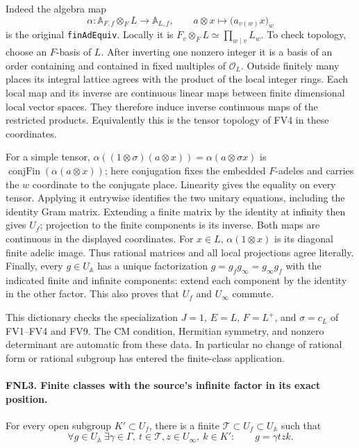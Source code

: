 \documentclass[11pt,a4paper]{article}
\numberwithin{equation}{section}
\theoremstyle{remark}\newtheorem{remark}[theorem]{Remark}
\begin{document}
Indeed the algebra map
\[
 \alpha:\mathbb A_{F,\allowbreak{} f}\otimes_F L\longrightarrow\mathbb A_{L,\allowbreak{} f},
 \qquad a\otimes x\longmapsto \bigl(a_{v(w)}x\bigr)_w
\]
is the original \texttt{fin\allowbreak Ad\allowbreak Equiv}.  Locally it is
\(F_v\otimes_F L\simeq\prod_{w\mid v}L_w\).
To check topology, choose an \(F\)-basis of \(L\).  After inverting
one nonzero integer it is a basis of an order containing and contained
in fixed multiples of \(\mathcal O_L\).  Outside finitely many places
its integral lattice agrees with the product of the local integer
rings.  Each local map and its inverse are continuous linear maps
between finite dimensional local vector spaces.  They therefore induce
inverse continuous maps of the restricted products.  Equivalently this
is the tensor topology of FV4 in these coordinates.

For a simple tensor,
\(\alpha((1\otimes\sigma)(a\otimes x))=\alpha(a\otimes\sigma x)\)
is \(\operatorname{conjFin}(\alpha(a\otimes x))\); here conjugation
fixes the embedded \(F\)-adeles and carries the \(w\) coordinate to
the conjugate place.  Linearity gives the equality on every tensor.
Applying it entrywise identifies the two unitary equations, including
the identity Gram matrix.  Extending a finite matrix by the identity
at infinity then gives \(U_f\); projection to the finite components
is its inverse.  Both maps are continuous in the displayed coordinates.
For \(x\in L\), \(\alpha(1\otimes x)\) is its diagonal finite
adelic image.  Thus rational matrices and all local projections agree
literally.  Finally, every \(g\in U_{\mathbb A}\) has a unique
factorization \(g=g_f g_\infty=g_\infty g_f\) with the indicated
finite and infinite components: extend each component by the identity
in the other factor.  This also proves that \(U_f\) and \(U_\infty\)
commute.

This dictionary checks the specialization \(J=1\), \(E=L\),
\(F=L^+\), and \(\sigma=c_L\) of FV1--FV4 and FV9.  The CM condition,
Hermitian symmetry, and nonzero determinant are automatic from these
data.  In particular no change of rational form or rational subgroup
has entered the finite-class application.

\paragraph{FNL3. Finite classes with the source's infinite factor in its exact position.}
\label{claim:FNL3}
For every open subgroup \(K'\subset U_f\), there is a finite
\(\mathcal T\subset U_f\subset U_{\mathbb A}\) such that
\begin{equation}\label{eq:fnl-class}
 \forall g\in U_{\mathbb A}\ \exists\gamma\in\Gamma,\ t\in\mathcal T,
 z\in U_\infty,\ k\in K':\qquad g=\gamma t z k.
\end{equation}
\end{document}
